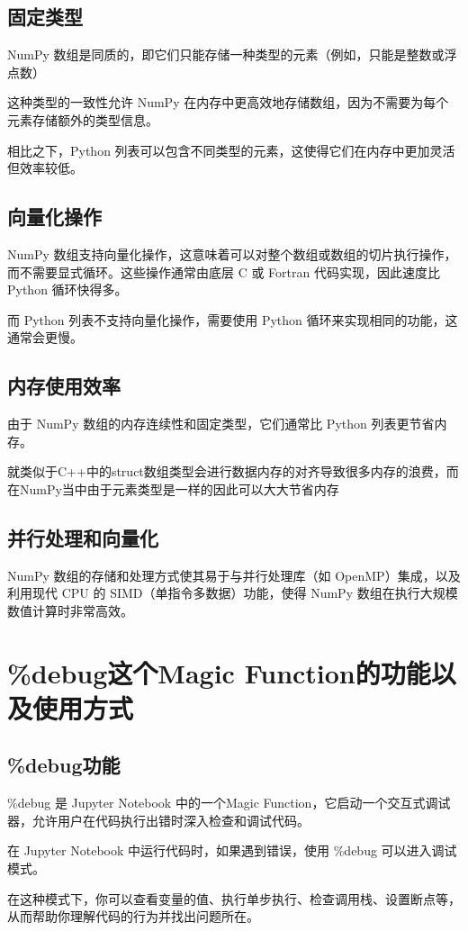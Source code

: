 \documentclass[10pt]{article}
\begin{document}
	\subsection{固定类型}NumPy 数组是同质的，即它们只能存储一种类型的元素（例如，只能是整数或浮点数）\par
	这种类型的一致性允许 NumPy 在内存中更高效地存储数组，因为不需要为每个元素存储额外的类型信息。\par
	相比之下，Python 列表可以包含不同类型的元素，这使得它们在内存中更加灵活但效率较低。
	\subsection{向量化操作}NumPy 数组支持向量化操作，这意味着可以对整个数组或数组的切片执行操作，而不需要显式循环。这些操作通常由底层 C 或 Fortran 代码实现，因此速度比 Python 循环快得多。\par
	而 Python 列表不支持向量化操作，需要使用 Python 循环来实现相同的功能，这通常会更慢。
	\subsection{内存使用效率}由于 NumPy 数组的内存连续性和固定类型，它们通常比 Python 列表更节省内存。\par
	就类似于C++中的struct数组类型会进行数据内存的对齐导致很多内存的浪费，而在NumPy当中由于元素类型是一样的因此可以大大节省内存
	\subsection{并行处理和向量化}NumPy 数组的存储和处理方式使其易于与并行处理库（如 OpenMP）集成，以及利用现代 CPU 的 SIMD（单指令多数据）功能，使得 NumPy 数组在执行大规模数值计算时非常高效。
	
	
	
	\section{\%debug这个Magic Function的功能以及使用方式}
	\subsection{\%debug功能}
	\%debug 是 Jupyter Notebook 中的一个Magic Function，它启动一个交互式调试器，允许用户在代码执行出错时深入检查和调试代码。\par
	在 Jupyter Notebook 中运行代码时，如果遇到错误，使用 \%debug 可以进入调试模式。\par
	在这种模式下，你可以查看变量的值、执行单步执行、检查调用栈、设置断点等，从而帮助你理解代码的行为并找出问题所在。
\end{document}
